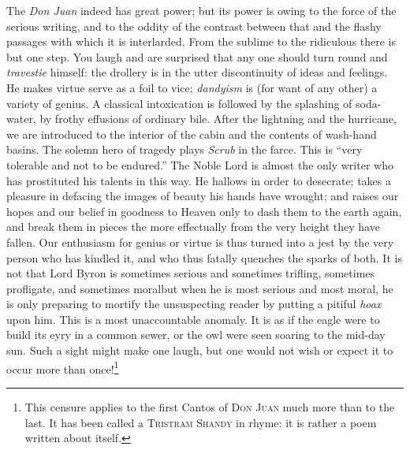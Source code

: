 The \emph{Don Juan} indeed has great power; but its power is owing to the
force of the serious writing, and to the oddity of the contrast between
that and the flashy passages with which it is interlarded. From the
sublime to the ridiculous there is but one step. You laugh and are
surprised that any one should turn round and \emph{travestie} himself: the
drollery is in the utter discontinuity of ideas and feelings. He makes
virtue serve as a foil to vice; \emph{dandyism} is (for want of any other) a
variety of genius. A classical intoxication is followed by the splashing
of soda-water, by frothy effusions of ordinary bile. After the lightning
and the hurricane, we are introduced to the interior of the cabin and
the contents of wash-hand basins. The solemn hero of tragedy plays
\emph{Scrub} in the farce. This is ``very tolerable and not to be endured.''
The Noble Lord is almost the only writer who has prostituted his talents
in this way. He hallows in order to desecrate; takes a pleasure in
defacing the images of beauty his hands have wrought; and raises our
hopes and our belief in goodness to Heaven only to dash them to the
earth again, and break them in pieces the more effectually from the very
height they have fallen. Our enthusiasm for genius or virtue is thus
turned into a jest by the very person who has kindled it, and who thus
fatally quenches the sparks of both. It is not that Lord Byron is
sometimes serious and sometimes trifling, sometimes profligate, and
sometimes moral\textemdash but when he is most serious and most moral, he is only
preparing to mortify the unsuspecting reader by putting a pitiful \emph{hoax}
upon him. This is a most unaccountable anomaly. It is as if the eagle
were to build its eyry in a common sewer, or the owl were seen soaring
to the mid-day sun. Such a sight might make one laugh, but one would not
wish or expect it to occur more than once!\footnote{This censure applies to the first Cantos of \textsc{Don Juan} much
more than to the last. It has been called a \textsc{Tristram Shandy} in rhyme: it
is rather a poem written about itself.}

